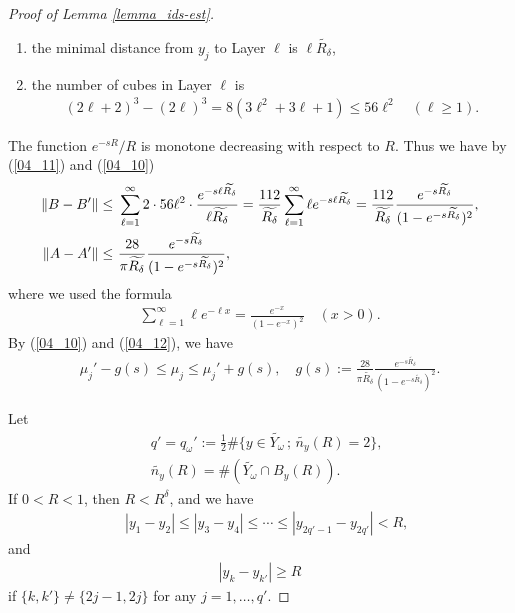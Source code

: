 \documentclass[12pt,a4paper]{article}
\begin{document}
\begin{proof}[Proof of Lemma \ref{lemma_ids-est}]
\begin{enumerate}
 \item[(iii)] the minimal distance from $y_j$ to Layer $\ell$ is 
$\ell \widetilde{R_\delta}$,


 \item[(iv)] the number of cubes in Layer $\ell$ is
\begin{align*}
(2\ell+2)^3-(2\ell)^3=8(3\ell^2+3\ell+1)\leq 56\ell^2
\quad (\ell\geq 1).
\end{align*}
\end{enumerate}
The function $e^{-sR}/R$ is monotone decreasing with respect to $R$.
Thus we have by (\ref{04_11}) and (\ref{04_10})
\begin{align}
 \|B-B'\|
\leq&\ 
\sum_{\ell=1}^\infty
2\cdot 56\ell^2\cdot \frac{e^{-s\ell \widetilde{R_\delta}}}{\ell \widetilde{R_\delta}}
=
\frac{112}{\widetilde{R_\delta}}\sum_{\ell=1}^\infty
\ell e^{-s \ell \widetilde{R_\delta}}
=
\frac{112}{\widetilde{R_\delta}}\frac{e^{-s\widetilde{R_\delta}}}{(1-e^{-s\widetilde{R_\delta}})^2},\notag\\
\|A-A'\|
\leq &\ 
\frac{28}{\pi \widetilde{R_\delta}}
\frac{e^{-s\widetilde{R_\delta}}}{(1-e^{-s\widetilde{R_\delta}})^2},
\label{04_12}
\end{align}
where we used the formula
\begin{align*}
 \sum_{\ell=1}^\infty \ell e^{-\ell x}=\frac{e^{-x}}{(1-e^{-x})^2}
\quad (x>0).
\end{align*}
By (\ref{04_10}) and (\ref{04_12}), we have
\begin{align}
\label{04_13}
\mu_j'-g(s) \leq \mu_j \leq \mu_j'+g(s),
\quad
g(s):=\frac{28}{\pi \widetilde{R_\delta}}
\frac{e^{-s\widetilde{R_\delta}}}{(1-e^{-s\widetilde{R_\delta}})^2}.
\end{align}

Let 
\begin{align*}
&\  q'=q_\omega':=
\frac{1}{2}\#\{y\in \widetilde{Y_\omega}\,;\, \widetilde{n_y}(R)=2\},\\
&\ 
\widetilde{n_y}(R)
=
\# (\widetilde{Y_\omega}\cap B_y(R)).
\end{align*}
If $0<R<1$, then $R<R^\delta$, and we have 
\begin{align}
&\ 
 |y_1-y_2|
\leq 
|y_3-y_4|
\leq
\cdots
\leq 
|y_{2q'-1}-y_{2q'}|
<
R,
\label{04_14}
\end{align}
and
\begin{align}
|y_{k}-y_{k'}|\geq R
\label{04_15}
\end{align}
if $\{k,k'\}\not=\{2j-1,2j\}$ for any $j=1,\ldots,q'$.


\end{proof}
\end{document}
